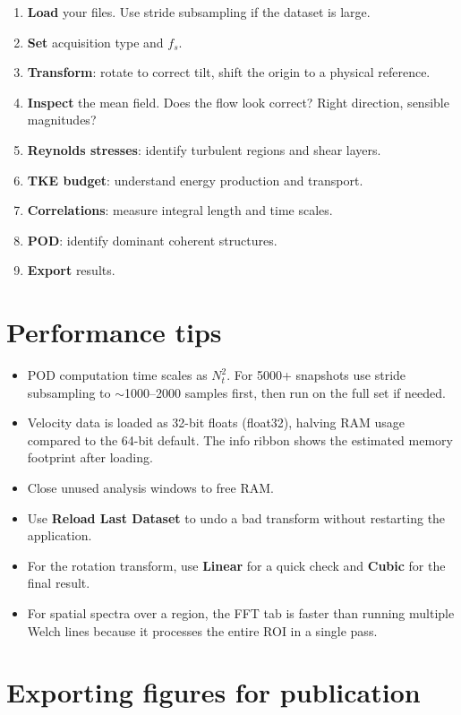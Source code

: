 \documentclass[11pt, a4paper]{report}
\newcommand{\uipth}[1]{\textbf{\textcolor{upblue}{#1}}}
\begin{document}
\begin{enumerate}[leftmargin=1.5em]
  \item \textbf{Load} your files. Use stride subsampling if the dataset is large.
  \item \textbf{Set} acquisition type and $f_s$.
  \item \textbf{Transform}: rotate to correct tilt, shift the origin to a physical reference.
  \item \textbf{Inspect} the mean field. Does the flow look correct? Right direction, sensible magnitudes?
  \item \textbf{Reynolds stresses}: identify turbulent regions and shear layers.
  \item \textbf{TKE budget}: understand energy production and transport.
  \item \textbf{Correlations}: measure integral length and time scales.
  \item \textbf{POD}: identify dominant coherent structures.
  \item \textbf{Export} results.
\end{enumerate}

\section{Performance tips}

\begin{itemize}[leftmargin=1.5em]
  \item POD computation time scales as $N_t^2$. For 5000+ snapshots use stride subsampling to $\sim$1000--2000 samples first, then run on the full set if needed.
  \item Velocity data is loaded as 32-bit floats (float32), halving RAM usage compared to the 64-bit default. The info ribbon shows the estimated memory footprint after loading.
  \item Close unused analysis windows to free RAM.
  \item Use \uipth{Reload Last Dataset} to undo a bad transform without restarting the application.
  \item For the rotation transform, use \uipth{Linear} for a quick check and \uipth{Cubic} for the final result.
  \item For spatial spectra over a region, the FFT tab is faster than running multiple Welch lines because it processes the entire ROI in a single pass.
\end{itemize}

\section{Exporting figures for publication}
\end{document}
